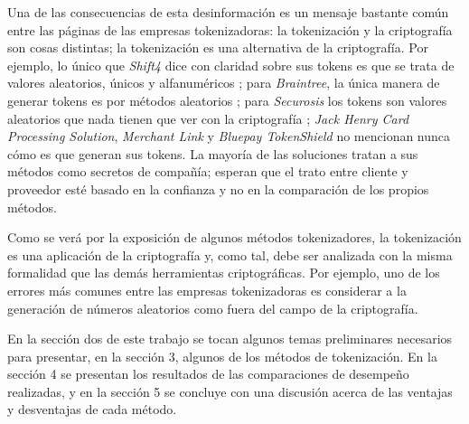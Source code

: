 Una de las consecuencias de esta desinformación es un mensaje bastante común
entre las páginas de las empresas tokenizadoras: la tokenización y la
criptografía son cosas distintas; la tokenización es una alternativa de la
criptografía. Por ejemplo, lo único que \textit{Shift4} dice con claridad sobre
sus tokens es que se trata de valores aleatorios, únicos y alfanuméricos
\cite{shif4_uno} \cite{shif4_dos}; para \textit{Braintree}, la única manera de
generar tokens es por métodos aleatorios \cite{braintree_uno}; para
\textit{Securosis} los tokens son valores aleatorios que nada tienen que ver con
la criptografía \cite{securosis}; \textit{Jack Henry Card Processing Solution},
\textit{Merchant Link} y \textit{Bluepay TokenShield} no mencionan nunca cómo es
que generan sus tokens. La mayoría de las soluciones tratan a sus métodos como
secretos de compañía; esperan que el trato entre cliente y proveedor esté basado
en la confianza y no en la comparación de los propios métodos.


Como se verá por la exposición de algunos métodos tokenizadores, la tokenización
es una aplicación de la criptografía y, como tal, debe ser analizada con la
misma formalidad que las demás herramientas criptográficas. Por ejemplo, uno de
los errores más comunes entre las empresas tokenizadoras es considerar a la
generación de números aleatorios como fuera del campo de la criptografía.


En la sección dos de este trabajo se tocan algunos temas preliminares necesarios
para presentar, en la sección 3, algunos de los métodos de tokenización. En la
sección 4 se presentan los resultados de las comparaciones de desempeño
realizadas, y en la sección 5 se concluye con una discusión acerca de las
ventajas y desventajas de cada método.
